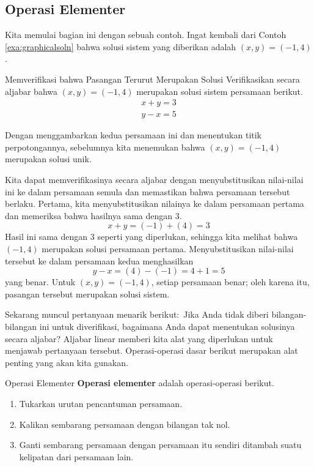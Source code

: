 \subsection{Operasi Elementer}

Kita memulai bagian ini dengan sebuah contoh. Ingat kembali dari Contoh \ref{exa:graphicalsoln} bahwa solusi sistem yang diberikan adalah $\left(x, y \right) = \left( -1, 4 \right)$.

\begin{example}{Memverifikasi bahwa Pasangan Terurut Merupakan Solusi}\label{exa:verifyingorderedpairsolution}
Verifikasikan secara aljabar bahwa $\left(x, y \right) = \left( -1, 4 \right)$ merupakan solusi sistem persamaan berikut.
\[
\begin{array}{c}
x+y=3 \\
y-x=5  
\label{eq1.2.1}
\end{array}
\]
\end{example}

\begin{solution} 
Dengan menggambarkan kedua persamaan ini dan menentukan titik
perpotongannya, sebelumnya kita menemukan bahwa $\left(x, y \right) = \left(
-1, 4 \right)$ merupakan solusi unik.

Kita dapat memverifikasinya secara aljabar dengan menyubstitusikan nilai-nilai ini
ke dalam persamaan semula dan memastikan bahwa persamaan tersebut berlaku.
Pertama, kita menyubstitusikan nilainya ke dalam persamaan pertama dan memeriksa bahwa hasilnya sama dengan $3$.
\[
x + y = (-1)+(4) = 3
\]
Hasil ini sama dengan $3$ seperti yang diperlukan, sehingga kita melihat bahwa $\left( -1,4 \right)$ merupakan solusi persamaan pertama.
Menyubstitusikan nilai-nilai tersebut ke dalam persamaan kedua menghasilkan
\[
y -x = (4) - (-1) = 4 + 1  = 5
\]
yang benar.
Untuk
$\left( x,y\right) =\left( -1,4\right) $, setiap persamaan benar; oleh karena itu, pasangan tersebut merupakan solusi sistem.
\end{solution}

Sekarang muncul pertanyaan menarik berikut:\ Jika Anda tidak diberi
bilangan-bilangan ini untuk diverifikasi, bagaimana Anda dapat menentukan solusinya secara aljabar? Aljabar linear memberi kita alat yang diperlukan untuk menjawab
pertanyaan tersebut. Operasi-operasi dasar berikut merupakan alat penting yang akan kita gunakan.

\begin{definition}{Operasi Elementer}\label{def:elementaryoperations}
\textbf{Operasi elementer}  adalah
operasi-operasi berikut.

\begin{enumerate}
\item Tukarkan urutan pencantuman persamaan.

\item Kalikan sembarang persamaan dengan bilangan tak nol.

\item Ganti sembarang persamaan dengan persamaan itu sendiri ditambah suatu kelipatan dari persamaan
lain.

\end{enumerate}
\end{definition}

